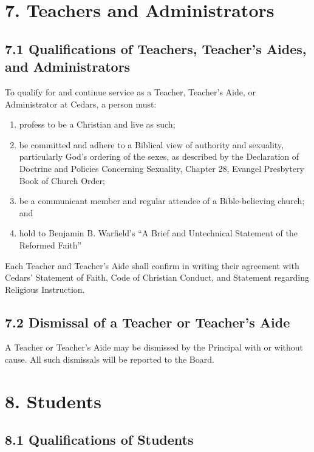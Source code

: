 \documentclass[
]{book}
\providecommand{\tightlist}{%
  \setlength{\itemsep}{0pt}\setlength{\parskip}{0pt}}
\begin{document}
\section{7. Teachers and Administrators}\label{teachers-and-administrators}

\subsection{7.1 Qualifications of Teachers, Teacher's Aides, and Administrators}\label{qualifications-of-teachers-teachers-aides-and-administrators}

To qualify for and continue service as a Teacher, Teacher's Aide, or Administrator at Cedars, a person must:

\begin{enumerate}
\def\labelenumi{\alph{enumi}.}
\tightlist
\item
  profess to be a Christian and live as such;
\item
  be committed and adhere to a Biblical view of authority and sexuality, particularly God's ordering of the sexes, as described by the Declaration of Doctrine and Policies Concerning Sexuality, Chapter 28, Evangel Presbytery Book of Church Order;
\item
  be a communicant member and regular attendee of a Bible-believing church; and
\item
  hold to Benjamin B. Warfield's ``A Brief and Untechnical Statement of the Reformed Faith''
\end{enumerate}

Each Teacher and Teacher's Aide shall confirm in writing their agreement with Cedars' Statement of Faith, Code of Christian Conduct, and Statement regarding Religious Instruction.

\subsection{7.2 Dismissal of a Teacher or Teacher's Aide}\label{dismissal-of-a-teacher-or-teachers-aide}

A Teacher or Teacher's Aide may be dismissed by the Principal with or without cause. All such dismissals will be reported to the Board.

\section{8. Students}\label{students}

\subsection{8.1 Qualifications of Students}\label{qualifications-of-students}
\end{document}
